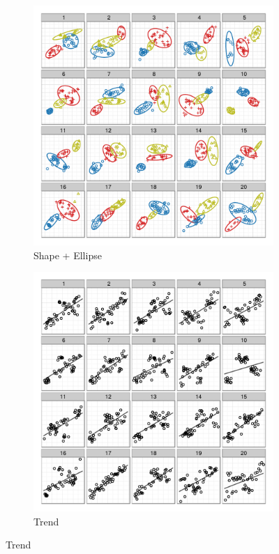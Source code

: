 \documentclass[11pt]{isuthesis}\usepackage[]{graphicx}\usepackage[]{color}
\begin{document}
\begin{figure}[ht]
\begin{subfigure}[t]{0.28\linewidth}
\end{subfigure}
\begin{subfigure}[t]{0.28\linewidth}
  \caption{Shape + Ellipse}
  \includegraphics[width=\linewidth]{fig-samplepics-6}
\end{subfigure}
\begin{subfigure}[t]{0.28\linewidth}
  \caption{Trend}
  \includegraphics[width=\linewidth]{fig-samplepics-7}

\end{subfigure}
\end{figure}
\end{document}
